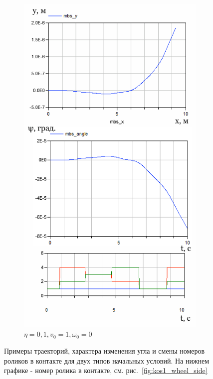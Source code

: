 \documentclass[12pt]{article}
\begin{document}
\begin{figure}[h!]
\hspace{5pt}
\begin{subfigure}{.47\textwidth}
    \centering
    \includegraphics[width=\textwidth]{img/res/example_v_1_0_omega_0_frac_1e-1_n_4_time_10s.png}
    \caption{$\eta = 0,1, v_0 = 1, \omega_0 = 0$}
    \label{fig:exp_example_v}
\end{subfigure}
\caption{Примеры траекторий, характера изменения угла и смены номеров роликов в контакте для двух типов начальных условий. На нижнем графике - номер ролика в контакте, см. рис.~\ref{fig:kos1_wheel_side}}
\label{fig:exp_examples}
\end{figure}
\end{document}
